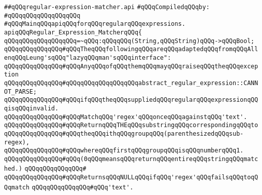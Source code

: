\label{src/lib/regex/glue/regular-expression-matcher.api}
\verb|##qQQqregular-expression-matcher.api|\newline
\newline
\verb|#qQQqCompiledqQQqby:|\newline
\verb|#qQQqqQQqqQQqqQQqqQQq|\newline
\newline
\verb|#qQQqMainqQQqapiqQQqforqQQqregularqQQqexpressions.|\newline
\newline
\newline
\verb|apiqQQqRegular_Expression_MatcherqQQq{|\newline
\newline
\verb|qQQqqQQqqQQqqQQqqQQq=~qQQq:qQQqqQQq(String,qQQqString)qQQq->qQQqBool;|\newline
\newline
\newline
\newline
\verb|qQQqqQQqqQQqqQQq#qQQqTheqQQqfollowingqQQqareqQQqadaptedqQQqfromqQQqAllenqQQqLeung'sqQQq"lazyqQQqman'sqQQqinterface":|\newline
\verb|qQQqqQQqqQQqqQQq#qQQqAnyqQQqofqQQqthemqQQqmayqQQqraiseqQQqtheqQQqexception|\newline
\verb|qQQqqQQqqQQqqQQq#qQQqqQQqqQQqqQQqqQQqabstract_regular_expression::CANNOT_PARSE;|\newline
\verb|qQQqqQQqqQQqqQQq#qQQqifqQQqtheqQQqsuppliedqQQqregularqQQqexpressionqQQqisqQQqinvalid.|\newline
\newline
\verb|qQQqqQQqqQQqqQQq#qQQqMatchqQQq'regex'qQQqonceqQQqagainstqQQq'text'.|\newline
\verb|qQQqqQQqqQQqqQQq#qQQqReturnqQQqTHEqQQqsubstringqQQqcorrespondingqQQqto|\newline
\verb|qQQqqQQqqQQqqQQq#qQQqtheqQQqithqQQqgroupqQQq(parenthesizedqQQqsub-regex),|\newline
\verb|qQQqqQQqqQQqqQQq#qQQqwhereqQQqfirstqQQqgroupqQQqisqQQqnumberqQQq1.|\newline
\verb|qQQqqQQqqQQqqQQq#qQQq(0qQQqmeansqQQqreturnqQQqentireqQQqstringqQQqmatched.)|\newline
\verb|qQQqqQQqqQQqqQQq#|\newline
\verb|qQQqqQQqqQQqqQQq#qQQqReturnsqQQqNULLqQQqifqQQq'regex'qQQqfailsqQQqtoqQQqmatch|\newline
\verb|qQQqqQQqqQQqqQQq#qQQq'text'.|\newline
